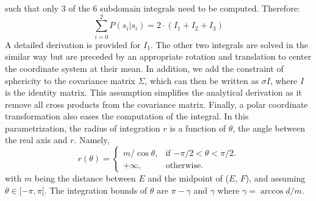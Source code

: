 such that only 3 of the 6 subdomain integrals need to be computed.
Therefore:
\begin{equation}
\sum_{i=0}^2{P(s_i | s_i)} = 2 \cdot ( I_1 + I_2 + I_3) \label{eq:total_non_overlap}
\end{equation}
A detailed derivation is provided for $I_1$. The other two integrals are solved in the similar way but are preceded by an appropriate rotation and translation to center the coordinate system at their mean. In addition, we add the constraint of sphericity to the covariance matrix $\Sigma$, which can then be written as $\sigma I$, where $I$ is the identity matrix. This assumption simplifies the analytical derivation as it remove all cross products from the covariance matrix. Finally, a polar coordinate transformation also eases the computation of the integral. In this parametrization, the radius of integration $r$ is a function of $\theta$, the angle between the real axis and $r$. Namely,
\begin{equation}
r(\theta) =\begin{cases}
    m / \cos \theta, & \text{if $-\pi/2<\theta<\pi/2$}.\\
    +\infty, & \text{otherwise}.
  \end{cases} 
\end{equation} 
with $m$ being the distance between $E$ and the midpoint of ($E$, $F$), and assuming $\theta \in [-\pi, \pi[$. The integration bounds of $\theta$ are $ \pi - \gamma$ and $\gamma$ where $\gamma = \arccos{d/m}$.

